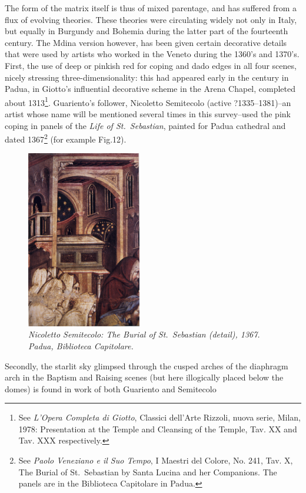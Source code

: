 \documentclass[a4paper,12pt]{article}
\begin{document}
The form of the matrix itself is thus of mixed parentage, and has
suffered from a flux of evolving theories.  These theories were
circulating widely not only in Italy, but equally in Burgundy and
Bohemia during the latter part of the fourteenth century.  The Mdina
version however, has been given certain decorative details that were
used by artists who worked in the Veneto during the 1360's and 1370's.
First, the use of deep or pinkish red for coping and dado edges in all
four scenes, nicely stressing three-dimensionality: this had appeared
early in the century in Padua, in Giotto's influential decorative
scheme in the Arena Chapel, completed about 1313\footnote{See
\textit{L'Opera Completa di Giotto}, Classici dell'Arte Rizzoli, nuova
serie, Milan, 1978: Presentation at the Temple and Cleansing of the
Temple, Tav. XX and Tav. XXX respectively.}. Guariento's follower,
Nicoletto Semitecolo (active ?1335--1381)--an artist whose name will
be mentioned several times in this survey--used the pink coping in
panels of the \textit{Life of St.~Sebastian}, painted for Padua
cathedral and dated 1367\footnote{See \textit{Paolo Veneziano e il Suo
Tempo}, I Maestri del Colore, No. 241, Tav. X, The Burial of
St.~Sebastian by Santa Lucina and her Companions. The panels are in
the Biblioteca Capitolare in Padua.} (for example Fig.12).
\begin{figure}[htbp]
\centering
\includegraphics[width=5cm]{pics/fig12.png}
\caption[Nicoletto Semitecolo: The Burial of St.~Sebastian (detail),
  1367]
{\it Nicoletto Semitecolo: The Burial of St.~Sebastian (detail), 1367.
Padua, Biblioteca Capitolare.} 
\end{figure}
Secondly,
the starlit sky glimpsed through the cusped arches of the diaphragm
arch in the Baptism and Raising scenes (but here illogically placed
below the domes) is found in work of both Guariento and Semitecolo
\end{document}
